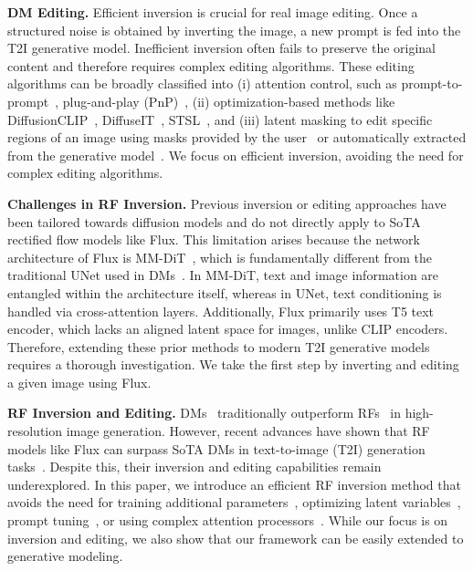 \documentclass{article} %
\theoremstyle{plain}
\begin{document}
\textbf{DM Editing.} 
Efficient inversion is crucial for real image editing. Once a structured noise is obtained by inverting the image, a new prompt is fed into the T2I generative model. 
Inefficient inversion often fails to preserve the original content and therefore requires complex editing algorithms. 
These editing algorithms can be broadly classified into (i) attention control, such as prompt-to-prompt~\citep{p2p}, plug-and-play (PnP)~\citep{pnp}, (ii) optimization-based methods like DiffusionCLIP~\citep{diffuseCLIP}, DiffuseIT~\citep{diffuseIT},  STSL~\citep{stsl}, and (iii)
latent masking to edit specific regions of an image using masks provided by the user~\citep{glide} or automatically extracted from the generative model~\citep{diffedit}. 
We focus on efficient inversion, avoiding the need for complex editing algorithms. 

\noindent\textbf{Challenges in RF Inversion.} 
Previous inversion or editing approaches have been tailored towards diffusion models and do not directly apply to SoTA rectified flow models like Flux. 
This limitation arises because the network architecture of Flux is MM-DiT~\citep{mmdit}, which is fundamentally different from the traditional UNet used in DMs~\citep{ddpm,ddim,songscore}.
In MM-DiT, text and image information are entangled within the architecture itself, whereas in UNet, text conditioning is handled via cross-attention layers. 
Additionally, Flux primarily uses T5 text encoder, which lacks an aligned latent space for images, unlike CLIP encoders.
Therefore, extending these prior methods to modern T2I generative models requires a thorough investigation. 
We take the first step by inverting and editing a given image using Flux.

\noindent\textbf{RF Inversion and Editing.}
DMs~\citep{ddpm,ddim,ldm} traditionally outperform RFs~\citep{lipman2022flow,rectflow,interpolant} in high-resolution image generation. 
However, recent advances have shown that RF models like Flux can surpass SoTA DMs in text-to-image (T2I) generation tasks~\citep{sd3}. 
Despite this, their inversion and editing capabilities remain underexplored.
In this paper, we introduce an efficient RF inversion method that avoids the need for training additional parameters~\citep{lora,dreambooth}, optimizing latent variables~\citep{stsl}, prompt tuning~\citep{nti}, or using complex attention processors~\citep{p2p}. 
While our focus is on inversion and editing, we also show that our framework can be easily extended to generative modeling.
\end{document}
